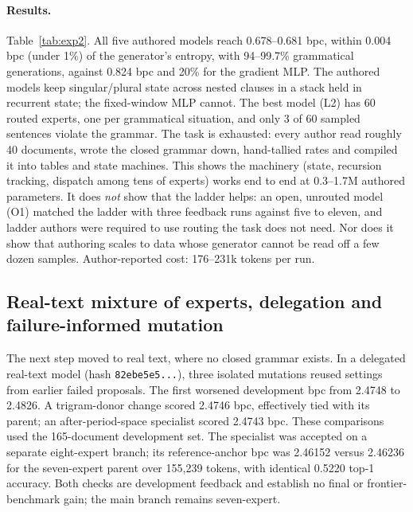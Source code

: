 \documentclass[11pt]{article}
\begin{document}
\paragraph{Results.} Table~\ref{tab:exp2}. All five authored models reach 0.678--0.681 bpc,
within 0.004 bpc (under 1\%) of the generator's entropy, with 94--99.7\% grammatical
generations, against 0.824 bpc and 20\% for the gradient MLP. The authored models keep
singular/plural state across nested clauses in a stack held in recurrent state; the fixed-window
MLP cannot. The best model (L2) has 60 routed experts, one per grammatical situation, and only 3
of 60 sampled sentences violate the grammar. The task is exhausted: every author read roughly 40
documents, wrote the closed grammar down, hand-tallied rates and compiled it into tables and
state machines. This shows the machinery (state, recursion tracking, dispatch among tens of
experts) works end to end at 0.3--1.7M authored parameters. It does \emph{not} show that the
ladder helps: an open, unrouted model (O1) matched the ladder with three feedback runs against
five to eleven, and ladder authors were required to use routing the task does not need. Nor does
it show that authoring scales to data whose generator cannot be read off a few dozen samples.
Author-reported cost: 176--231k tokens per run.

\subsection{Real-text mixture of experts, delegation and failure-informed mutation}\label{sec:realtext}
The next step moved to real text, where no closed grammar exists. In a delegated real-text
model (hash \texttt{82ebe5e5...}), three isolated mutations reused settings from earlier failed
proposals. The first worsened development bpc from 2.4748 to 2.4826. A trigram-donor change
scored 2.4746 bpc, effectively tied with its parent; an after-period-space specialist scored
2.4743 bpc. These comparisons used the 165-document development set. The specialist was accepted
on a separate eight-expert branch; its reference-anchor bpc was 2.46152 versus 2.46236 for the
seven-expert parent over 155{,}239 tokens, with identical 0.5220 top-1 accuracy. Both checks are
development feedback and establish no final or frontier-benchmark gain; the main branch remains
seven-expert.
\end{document}
